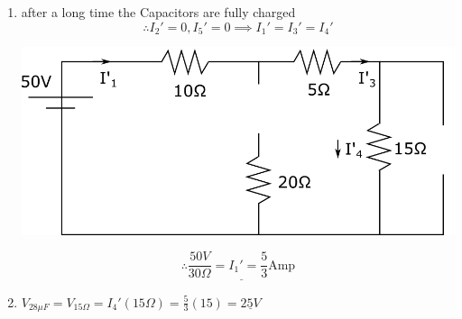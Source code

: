 \begin{enumerate}
	\item after a long time the Capacitors are fully charged
	$$\therefore I_2'=0, I_5'=0 \implies I_1'=I_3'=I_4'$$
	
	\includegraphics[width=0.6\linewidth]{Images/P8img4.png}
	
	$$\therefore \underline{\frac{50V}{30\Omega}=I_1'=\frac{5}{3}\textrm{Amp}}$$
	
	\item $V_{28\mu F}=V_{15\Omega}=I_4'(15\Omega)=\frac{5}{3}(15)=
	\underline{25V}$
\end{enumerate}